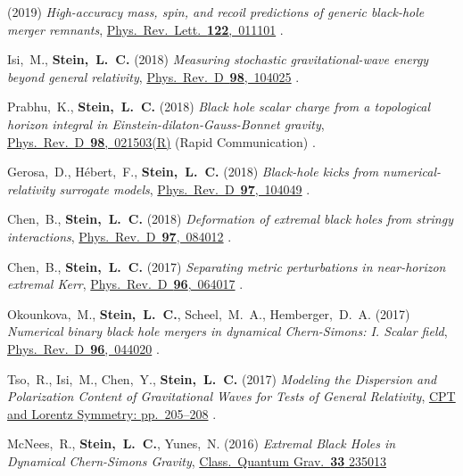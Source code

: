 \begin{etaremune}[start=\value{pubCounter}]
  (2019)
  {\it High-accuracy mass, spin, and recoil predictions of generic black-hole merger remnants},
  \href{https://doi.org/10.1103/PhysRevLett.122.011101}{Phys.~Rev.~Lett.~{\bf 122},~011101}
  .
\item
  Isi,~M., {\bf Stein,~L.~C.}
  (2018)
  {\it Measuring stochastic gravitational-wave energy beyond general relativity},
  \href{https://doi.org/10.1103/PhysRevD.98.104025}{Phys.~Rev.~D~{\bf 98},~104025}
  .
\item
  Prabhu,~K., {\bf Stein,~L.~C.}
  (2018)
  {\it Black hole scalar charge from a topological horizon integral in
    Einstein-dilaton-Gauss-Bonnet gravity},
  \href{https://doi.org/10.1103/PhysRevD.98.021503}{Phys.~Rev.~D~{\bf 98},~021503(R)}
  (Rapid Communication)
  .
\item
  Gerosa,~D., H\'ebert,~F., {\bf Stein,~L.~C.}
  (2018)
  {\it Black-hole kicks from numerical-relativity surrogate models},
  \href{https://doi.org/10.1103/PhysRevD.97.104049}{Phys.~Rev.~D~{\bf 97},~104049}
  .
\item
  Chen,~B., {\bf Stein,~L.~C.}
  (2018)
  {\it Deformation of extremal black holes from stringy interactions},
  \href{https://doi.org/10.1103/PhysRevD.97.084012}{Phys.~Rev.~D~{\bf 97},~084012}
  .
\item
  Chen,~B., {\bf Stein,~L.~C.}
  (2017)
  {\it Separating metric perturbations in near-horizon extremal Kerr},
  \href{https://doi.org/10.1103/PhysRevD.96.064017}{Phys.~Rev.~D~{\bf 96},~064017}
  .
\item
  Okounkova,~M.,
  {\bf Stein,~L.~C.},
  Scheel,~M.~A.,
  Hemberger,~D.~A.
  (2017)
  {\it Numerical binary black hole mergers in dynamical Chern-Simons:
    I. Scalar field},
  \href{https://doi.org/10.1103/PhysRevD.96.044020}{Phys.~Rev.~D~{\bf 96},~044020}
  .
\item
  Tso,~R., Isi,~M., Chen,~Y., {\bf Stein,~L.~C.}
  (2017)
  {\it Modeling the Dispersion and Polarization Content of
    Gravitational Waves for Tests of General Relativity},
  \href{http://dx.doi.org/10.1142/9789813148505_0052}{CPT and Lorentz Symmetry: pp.~205--208}
  .
\item
  McNees,~R., {\bf Stein,~L.~C.}, Yunes,~N.
  (2016)
  {\it Extremal Black Holes in Dynamical Chern-Simons Gravity},
  \href{http://dx.doi.org/10.1088/0264-9381/33/23/235013}{Class.~Quantum Grav.~{\bf 33} 235013}

\end{etaremune}

